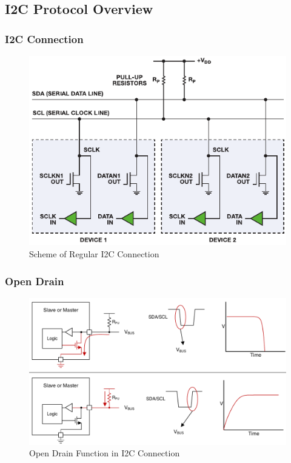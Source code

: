 \subsection{I2C Protocol Overview}

\begin{frame}
  \frametitle{I2C Connection}
  \begin{figure}
    \centering
    \includegraphics[scale=0.9]{images/i2c-connection.pdf}
    \caption{Scheme of Regular I2C Connection}
  \end{figure}
  \vspace*{-10mm}
\end{frame}

\begin{frame}
  \frametitle{Open Drain}
  \begin{figure}
    \centering
    \includegraphics[scale=0.3]{images/open-drain.png}
    \caption{Open Drain Function in I2C Connection}
  \end{figure}
  \vspace*{-10mm}
\end{frame}

